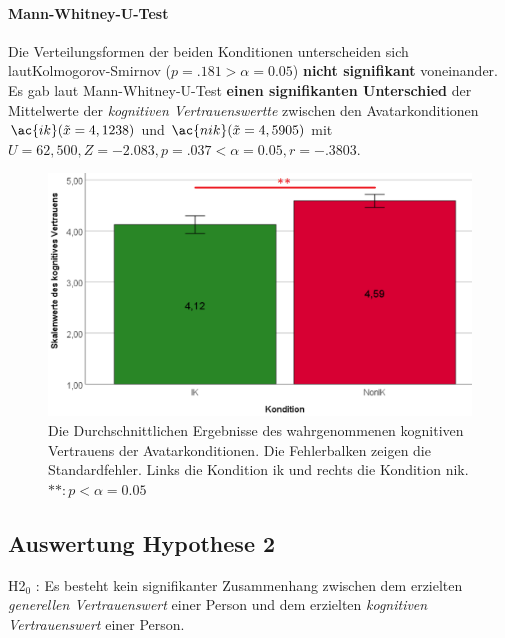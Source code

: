 \documentclass[a4paper,11pt]{article}%
\renewcommand{\\}{\vspace*{0.5\baselineskip} \newline}
\begin{document}
\paragraph{Mann-Whitney-U-Test}
Die Verteilungsformen der beiden Konditionen unterscheiden sich laut\newline Kolmogorov-Smirnov ($p = .181 > \alpha = 0.05$) \textbf{nicht signifikant} voneinander. Es gab laut Mann-Whitney-U-Test \textbf{einen signifikanten Unterschied} der Mittelwerte der \textit{kognitiven Vertrauenswertte} zwischen den Avatarkonditionen $\ac{ik} (\tilde x = 4,1238)$ und  $\ac{nik} (\tilde x = 4,5905)$ mit $U = 62,500 , Z = -2.083, p = .037 < \alpha = 0.05, r =-.3803$. \\

	\begin{figure}[H]
		\begin{footnotesize}
		\centering
			\includegraphics[scale=0.5]{Abbildungen/AuswertungDiagramme/H1_Mittelwerte.png}
			\caption[Mittelwerte und der Standardfehler der kognitiven Vertrauenswerte]{Die Durchschnittlichen Ergebnisse des wahrgenommenen kognitiven Vertrauens der Avatarkonditionen. Die Fehlerbalken zeigen die Standardfehler. Links die Kondition \ac{ik} und rechts die Kondition \ac{nik}. $** : p < \alpha = 0.05$}
			\label{H1_Mittelwerte_Auswertung}
		\end{footnotesize}
	\end{figure}
\newpage

\subsection{Auswertung Hypothese 2}
H2$_{0}$ : Es besteht kein signifikanter Zusammenhang zwischen dem erzielten \textit{generellen Vertrauenswert} einer Person und dem erzielten \textit{kognitiven Vertrauenswert} einer Person.
\end{document}
